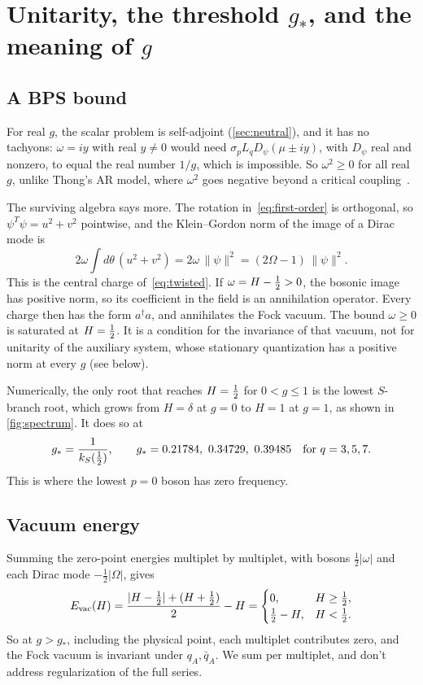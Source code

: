 \section{Unitarity, the threshold $g_*$, and the meaning of $g$}
\label{sec:stability}

\subsection{A BPS bound}

For real $g$, the scalar problem is self-adjoint (\cref{sec:neutral}), and it has no tachyons: $\omega=iy$ with real $y\neq0$ would need $\sigma_pL_qD_\psi(\mu\pm iy)$, with $D_\psi$ real and nonzero, to equal the real number $1/g$, which is impossible. So $\omega^2\ge0$ for all real $g$, unlike Thong's AR model, where $\omega^2$ goes negative beyond a critical coupling~\cite{Thong:2026}.

The surviving algebra says more. The rotation in~\eqref{eq:first-order} is orthogonal, so $\psi^T\psi=u^2+v^2$ pointwise, and the Klein--Gordon norm of the image of a Dirac mode is
\begin{equation}\label{eq:norm}
2\omega\int d\theta\,(u^2+v^2)=2\omega\,\|\psi\|^2=(2\Omega-1)\,\|\psi\|^2.
\end{equation}
This is the central charge of~\eqref{eq:twisted}. If $\omega=H-\tfrac12>0$, the bosonic image has positive norm, so its coefficient in the field is an annihilation operator. Every charge then has the form $a^\dagger a$, and annihilates the Fock vacuum. The bound $\omega\ge0$ is saturated at $H=\tfrac12$. It is a condition for the invariance of that vacuum, not for unitarity of the auxiliary system, whose stationary quantization has a positive norm at every $g$ (see below).

Numerically, the only root that reaches $H=\tfrac12$ for $0<g\le1$ is the lowest $S$-branch root, which grows from $H=\delta$ at $g=0$ to $H=1$ at $g=1$, as shown in \cref{fig:spectrum}. It does so at
\begin{equation}\label{eq:gstar}
g_*=\frac{1}{k_S(\half)},\qquad g_*=0.21784,\ 0.34729,\ 0.39485\quad\text{for }q=3,5,7.
\end{equation}
This is where the lowest $p=0$ boson has zero frequency.

\subsection{Vacuum energy}

Summing the zero-point energies multiplet by multiplet, with bosons $\tfrac12|\omega|$ and each Dirac mode $-\tfrac12|\Omega|$, gives
\begin{equation}\label{eq:vacuum}
E_{\rm vac}(H)=\frac{|H-\tfrac12|+(H+\tfrac12)}{2}-H=
\begin{cases}0,&H\ge\tfrac12,\\ \tfrac12-H,&H<\tfrac12.\end{cases}
\end{equation}
So at $g>g_*$, including the physical point, each multiplet contributes zero, and the Fock vacuum is invariant under $q_A,\bar q_A$. We sum per multiplet, and don't address regularization of the full series.

